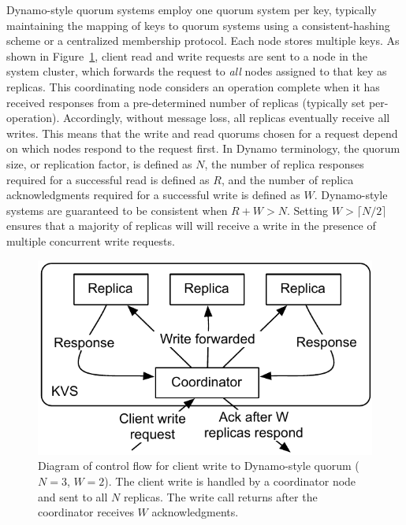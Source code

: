 \documentclass{vldb}
\begin{document}
Dynamo-style quorum systems employ one quorum system per key,
typically maintaining the mapping of keys to quorum systems using a
consistent-hashing scheme or a centralized membership protocol. Each
node stores multiple keys.  As shown in
Figure~\ref{fig:dynamo-quorum}, client read and write requests are
sent to a node in the system cluster, which forwards the request to
\textit{all} nodes assigned to that key as replicas.  This
coordinating node considers an operation complete when it has received
responses from a pre-determined number of replicas (typically set
per-operation).  Accordingly, without message loss, all replicas
eventually receive all writes.  This means that the write and read
quorums chosen for a request depend on which nodes respond to the
request first.  In Dynamo terminology, the quorum size, or replication
factor, is defined as $N$, the number of replica responses required
for a successful read is defined as $R$, and the number of replica
acknowledgments required for a successful write is defined as
$W$. Dynamo-style systems are guaranteed to be consistent when $R+W >
N$.  Setting $W>\lceil N/2 \rceil$ ensures that a majority of replicas
will will receive a write in the presence of multiple concurrent write
requests.

\begin{figure}
\centering
\includegraphics[width=.85\columnwidth]{figs/dynamo-quorum.pdf}
\vspace{-8pt}
\caption{Diagram of control flow for client write to Dynamo-style
  quorum ($N=3$, $W=2$).  The client write is handled by a
  coordinator node and sent to all $N$ replicas. The write call returns
  after the coordinator receives $W$ acknowledgments.}
\vspace{-12pt}
\label{fig:dynamo-quorum}
\end{figure}
\end{document}
